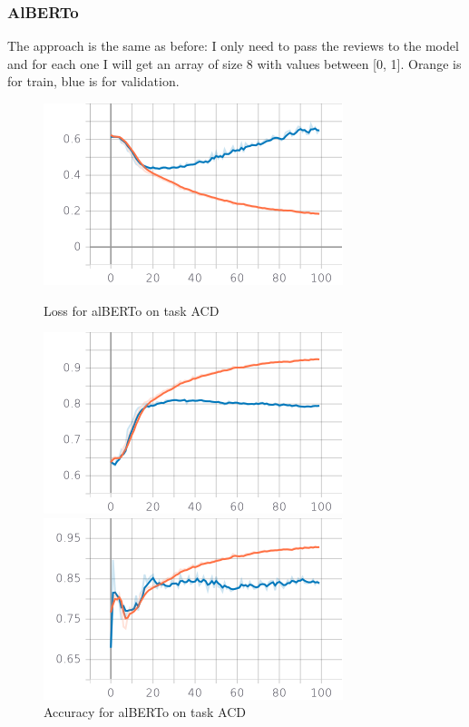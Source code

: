 \documentclass{article}
\begin{document}
            \subsubsection{AlBERTo}
                The approach is the same as before: I only need to pass the reviews to the model and for each one I will get an array of size 8 with values between [0, 1].
                \color{orange} Orange is for train, \color{blue} blue is for validation.\color{black}
                \begin{figure}[!htb]
                \begin{minipage}{0.48\textwidth}
                    \centering
                    \includegraphics[width=.7\linewidth]{alberto_acd_epoch_loss.png}
                    \caption{Loss for alBERTo on task ACD}\label{Fig:Data10}
                \end{minipage}\hfill
                \begin{minipage}{0.48\textwidth}
                    \centering
                    \includegraphics[width=.7\linewidth]{alberto_acd_epoch_accuracy.png}
                    \caption{Accuracy for alBERTo on task ACD}\label{Fig:Data11}
                \end{minipage}
                \begin{minipage}{0.48\textwidth}
                    \centering
                    \includegraphics[width=.7\linewidth]{alberto_acd_epoch_recall.png}

\end{minipage}
\end{figure}
\end{document}
